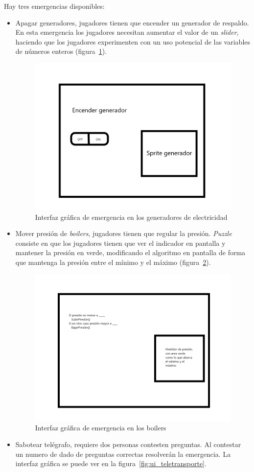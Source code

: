 Hay tres emergencias disponibles:
\begin{itemize}
    \item Apagar generadores, jugadores tienen que encender un generador de respaldo. En esta emergencia los jugadores necesitan aumentar el valor de un \textit{slider}, haciendo que los jugadores experimenten con un uso potencial de las variables de números enteros (figura~\ref{fig:ui_sab_generador}).
    \begin{figure}[H]
        \centering
        \includegraphics[width=0.5\linewidth]{images/SabotageGenerador.png}
        \caption{Interfaz gráfica de emergencia en los generadores de electricidad}
        \label{fig:ui_sab_generador}
    \end{figure}
    \item Mover presión de \textit{boilers}, jugadores tienen que regular la presión. \textit{Puzzle} consiste en que los jugadores tienen que ver el indicador en pantalla y mantener la presión en verde, modificando el algoritmo en pantalla de forma que mantenga la presión entre el mínimo y el máximo (figura~\ref{fig:ui_sab_presion}).
    \begin{figure}[H]
        \centering
        \includegraphics[width=0.5\linewidth]{images/SabotagePresion.png}
        \caption{Interfaz gráfica de emergencia en los boilers}
        \label{fig:ui_sab_presion}
    \end{figure}
    \item Sabotear telégrafo, requiere dos personas contesten preguntas. Al contestar un numero de dado de preguntas correctas resolverán la emergencia. La interfaz gráfica se puede ver en la figura~\ref{fig:ui_teletransporte}.

\end{itemize}
